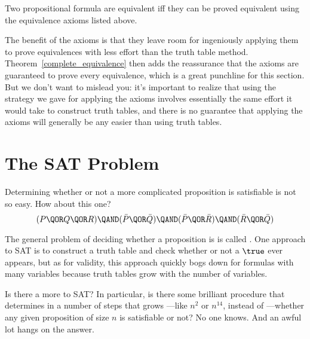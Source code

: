 \begin{theorem}
\label{complete_equivalence}
Two propositional formula are equivalent iff they can be proved
equivalent using the equivalence axioms listed above.
\end{theorem}

The benefit of the axioms is that they leave room for ingeniously
applying them to prove equivalences with less effort than the truth
table method.  Theorem~\ref{complete_equivalence} then adds the
reassurance that the axioms are guaranteed to prove every equivalence,
which is a great punchline for this section.  But we don't want to
mislead you: it's important to realize that using the strategy we gave
for applying the axioms involves essentially the same effort it would
take to construct truth tables, and there is no guarantee that applying the
axioms will generally be any easier than using truth tables.

\begin{problems}
\practiceproblems
{}

\classproblems
{}

\homeworkproblems
{}

\end{problems}

\section{The SAT Problem}\label{SAT_sec}
Determining whether or not a more complicated proposition is
satisfiable is not so easy.  How about this one?
%
\[
(P \QOR Q \QOR R) \QAND (\bar P \QOR \bar Q)
                  \QAND (\bar P \QOR \bar R)
                  \QAND (\bar R \QOR \bar Q)
\]

The general problem of deciding whether a proposition is 
is called .  One approach to SAT is to construct a truth table
and check whether or not a $\true$ ever appears, but as for validity, this
approach quickly bogs down for formulas with many variables
because truth tables grow  with the number of
variables.

Is there a more  to SAT?  In particular, is
there some brilliant procedure that determines in a number of steps
that grows \emph{} ---like
$n^2$ or $n^{14}$, instead of \emph{} ---whether any given proposition of size
$n$ is satisfiable or not?  No one knows.  And an awful lot hangs on
the answer.

